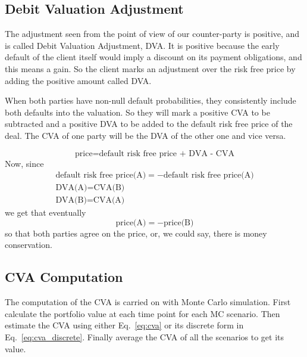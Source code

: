 \subsection{Debit Valuation Adjustment}

The adjustment seen from the point of view of our counter-party is positive, and is called Debit Valuation Adjustment, DVA. It is positive because the early default of the client itself would imply a discount on its payment obligations, and this means a gain. So the client marks an adjustment over the risk free price by adding the positive amount called DVA. 

When both parties have non-null default probabilities, they consistently include both defaults into the valuation. So they will mark a positive CVA to be subtracted and a positive DVA to be added to the default risk free price of the deal. The CVA of one party will be the DVA of the other one and vice versa.

\begin{equation*}
\textrm{price}=\textrm{default risk free price + DVA - CVA}
\end{equation*}
Now, since
\begin{equation*}
\begin{gathered}
\textrm{default risk free price(A)} = - \textrm{default risk free price(A)} \\
\textrm{DVA(A)} = \textrm{CVA(B)} \\
\textrm{DVA(B)} = \textrm{CVA(A)} 
\end{gathered}
\end{equation*}
we get that eventually
\begin{equation*}
\textrm{price(A)} = -\textrm{price(B)}
\end{equation*}
so that both parties agree on the price, or, we could say, there is money conservation.

\subsection{CVA Computation}

The computation of the CVA is carried on with Monte Carlo simulation. 
First calculate the portfolio value at each time point for each MC scenario. Then estimate the CVA using either Eq.~\ref{eq:cva} or its discrete form in Eq.~\ref{eq:cva_discrete}. Finally average the CVA of all the scenarios to get its value.


